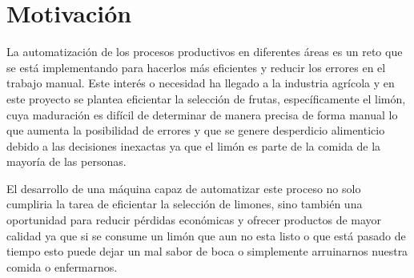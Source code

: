 \section{Motivación}
La automatización de los procesos productivos en diferentes áreas es un reto que se está implementando para hacerlos más eficientes y reducir los errores en el trabajo manual. Este interés o necesidad ha llegado a la industria agrícola y en este proyecto se plantea eficientar la selección de frutas, específicamente el limón, cuya maduración es difícil de determinar de manera precisa de forma manual lo que aumenta la posibilidad de errores y que se genere desperdicio alimenticio debido a las decisiones inexactas ya que el limón es parte de la comida de la mayoría de las personas. 

El desarrollo de una máquina capaz de automatizar este proceso no solo cumpliria la tarea de eficientar la selección de limones, sino también una oportunidad para reducir pérdidas económicas y ofrecer productos de mayor calidad ya que si se consume un limón que aun no esta listo o que está pasado de tiempo esto puede dejar un mal sabor de boca o simplemente arruinarnos nuestra comida o enfermarnos.
